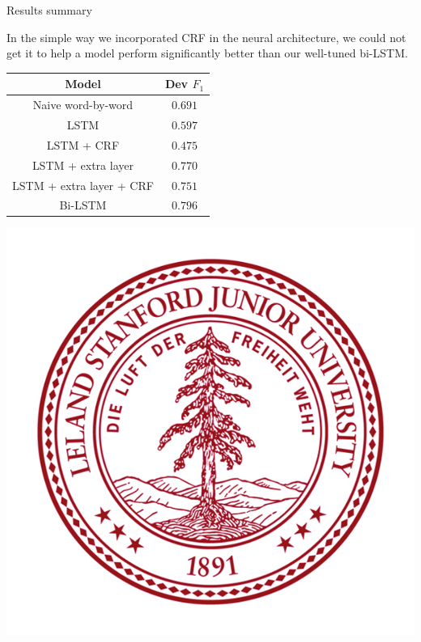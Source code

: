 \documentclass[final]{beamer}
\newlength{\onecolwid}
\begin{document}
\begin{frame}[t]
\begin{columns}[t]
\begin{column}{\onecolwid}


\begin{block}{Results summary}

In the simple way we incorporated CRF in the neural architecture, we could not get it to help a model perform significantly better than our well-tuned bi-LSTM.

\vspace{10px}

\begin{center}
   \begin{tabular}{||c | c||}
   \hline
   \textbf{Model}  & \textbf{Dev $F_1$} \\
   \hline\hline
   Naive word-by-word & $0.691$ \\
   \hline
   LSTM & $0.597$ \\
   \hline
   LSTM + CRF & $0.475$ \\
   \hline
   LSTM + extra layer & $0.770$ \\
   \hline
   LSTM + extra layer + CRF & $0.751$ \\
   \hline
   Bi-LSTM & $0.796$ \\ [1ex]
   \hline
  \end{tabular}
\end{center}


\begin{center}
    \includegraphics[scale=0.5]{figs/Stanford_logo}
\end{center}
\end{block}


\end{column}
\end{columns}
\end{frame}
\end{document}
